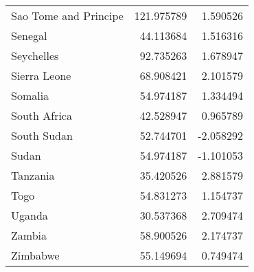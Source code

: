 \begin{tabular}{lrr}
Sao Tome and Principe    &                      121.975789 &                              1.590526 \\
Senegal                  &                       44.113684 &                              1.516316 \\
Seychelles               &                       92.735263 &                              1.678947 \\
Sierra Leone             &                       68.908421 &                              2.101579 \\
Somalia                  &                       54.974187 &                              1.334494 \\
South Africa             &                       42.528947 &                              0.965789 \\
South Sudan              &                       52.744701 &                             -2.058292 \\
Sudan                    &                       54.974187 &                             -1.101053 \\
Tanzania                 &                       35.420526 &                              2.881579 \\
Togo                     &                       54.831273 &                              1.154737 \\
Uganda                   &                       30.537368 &                              2.709474 \\
Zambia                   &                       58.900526 &                              2.174737 \\
Zimbabwe                 &                       55.149694 &                              0.749474 \\
\bottomrule
\end{tabular}
